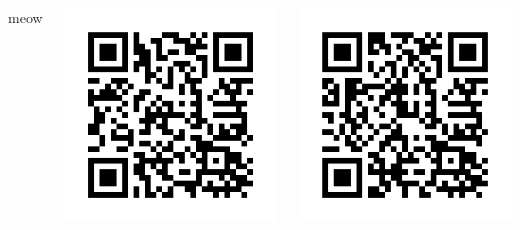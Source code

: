 \documentclass{tikzposter}
\begin{document}
    \begin{columns}

         {meow}


        {
            \Large
            \begin{tikzfigure}
                \label{fig:pandalyzer_repo}
                \includegraphics{img/qr_pandalyzer_github}
            \end{tikzfigure}
            \begin{tikzfigure}
                \label{fig:thesis_repo}
                \includegraphics{img/qr_thesis_github}
            \end{tikzfigure}
        }

    \end{columns}
\end{document}
